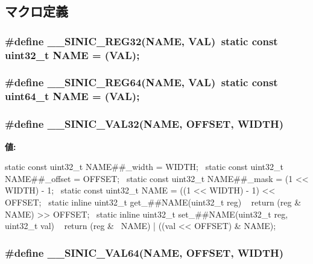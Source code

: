 \subsection{マクロ定義}
\hypertarget{sinicreg_8hh_aa11dfb860e2debd2029da85ba29bdf94}{
\subsubsection[{\_\-\_\-SINIC\_\-REG32}]{\setlength{\rightskip}{0pt plus 5cm}\#define \_\-\_\-SINIC\_\-REG32(NAME, \/  VAL)~static const {\bf uint32\_\-t} NAME = (VAL);}}
\label{sinicreg_8hh_aa11dfb860e2debd2029da85ba29bdf94}
\hypertarget{sinicreg_8hh_a4c4205d0815375c92d8c1e275159b3b0}{
\subsubsection[{\_\-\_\-SINIC\_\-REG64}]{\setlength{\rightskip}{0pt plus 5cm}\#define \_\-\_\-SINIC\_\-REG64(NAME, \/  VAL)~static const uint64\_\-t NAME = (VAL);}}
\label{sinicreg_8hh_a4c4205d0815375c92d8c1e275159b3b0}
\hypertarget{sinicreg_8hh_a1d2f3376fdf5ddbfaeceb608e2f04906}{
\subsubsection[{\_\-\_\-SINIC\_\-VAL32}]{\setlength{\rightskip}{0pt plus 5cm}\#define \_\-\_\-SINIC\_\-VAL32(NAME, \/  OFFSET, \/  WIDTH)}}
\label{sinicreg_8hh_a1d2f3376fdf5ddbfaeceb608e2f04906}
{\bfseries 値:}
\begin{DoxyCode}
static const uint32_t NAME##_width = WIDTH; \
        static const uint32_t NAME##_offset = OFFSET; \
        static const uint32_t NAME##_mask = (1 << WIDTH) - 1; \
        static const uint32_t NAME = ((1 << WIDTH) - 1) << OFFSET; \
        static inline uint32_t get_##NAME(uint32_t reg) \
        { return (reg & NAME) >> OFFSET; } \
        static inline uint32_t set_##NAME(uint32_t reg, uint32_t val) \
        { return (reg & ~NAME) | ((val << OFFSET) & NAME); }
\end{DoxyCode}
\hypertarget{sinicreg_8hh_ab6ae16561ac71ad7de115787fd394586}{
\subsubsection[{\_\-\_\-SINIC\_\-VAL64}]{\setlength{\rightskip}{0pt plus 5cm}\#define \_\-\_\-SINIC\_\-VAL64(NAME, \/  OFFSET, \/  WIDTH)}}
